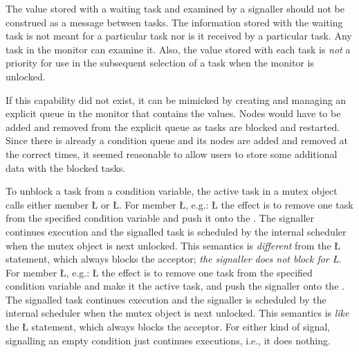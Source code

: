 \documentclass[openright,twoside]{report}
\begin{document}
\begin{annotation}
The value stored with a waiting task and examined by a signaller should not be construed as a message between tasks.
The information stored with the waiting task is not meant for a particular task nor is it received by a particular task.
Any task in the monitor can examine it.
Also, the value stored with each task is \emph{not} a priority for use in the subsequent selection of a task when the monitor is unlocked.

If this capability did not exist, it can be mimicked by creating and managing an explicit queue in the monitor that contains the values.
Nodes would have to be added and removed from the explicit queue as tasks are blocked and restarted.
Since there is already a condition queue and its nodes are added and removed at the correct times, it seemed reasonable to allow users to store some additional data with the blocked tasks.
\end{annotation}

To unblock a task from a condition variable, the active task in a mutex object calls either member \LGinlinetrue\LGbegin\lgrinde\L{}\endlgrinde\LGend{} or \LGinlinetrue\LGbegin\lgrinde\L{}\endlgrinde\LGend{}.
For member \LGinlinetrue\LGbegin\lgrinde\L{}\endlgrinde\LGend{}\label{p:signal}, e.g.:
\LGinlinefalse\LGbegin\lgrinde
\L{}
\endlgrinde\LGend
the effect is to remove one task from the specified condition variable and push it onto the .
The signaller continues execution and the signalled task is scheduled by the internal scheduler when the mutex object is next unlocked.
This semantics is \emph{different} from the \LGinlinetrue\LGbegin\lgrinde\L{}\endlgrinde\LGend{} statement, which always blocks the acceptor;
\emph{the signaller does not block for \LGinlinetrue\LGbegin\lgrinde\L{}\endlgrinde\LGend{}.}
For member \LGinlinetrue\LGbegin\lgrinde\L{}\endlgrinde\LGend{}\label{p:signalBlock}, e.g.:
\LGinlinefalse\LGbegin\lgrinde
\L{}
\endlgrinde\LGend
the effect is to remove one task from the specified condition variable and make it the active task, and push the signaller onto the .
The signalled task continues execution and the signaller is scheduled by the internal scheduler when the mutex object is next unlocked.
This semantics is \emph{like} the \LGinlinetrue\LGbegin\lgrinde\L{}\endlgrinde\LGend{} statement, which always blocks the acceptor.
For either kind of signal, signalling an empty condition just continues executions, i.e., it does nothing.
\end{document}
